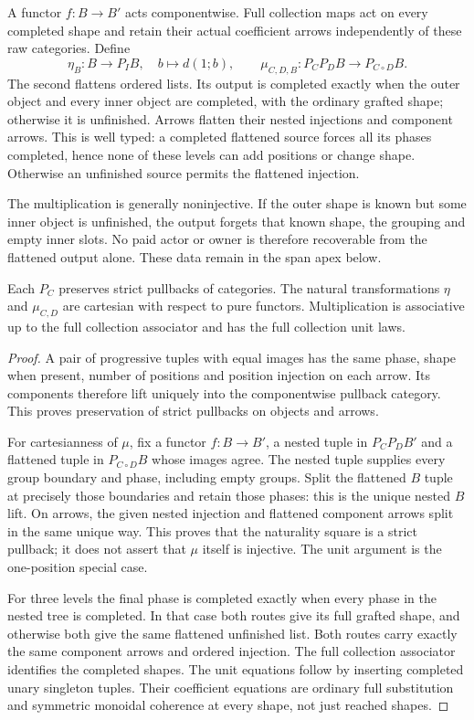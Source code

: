 \documentclass[11pt]{article}
\begin{document}
A functor $f:B\to B'$ acts componentwise. Full collection maps act on every completed shape and retain their actual coefficient arrows independently of these raw categories. Define
\[
 \eta_B:B\to P_I B,\quad b\mapsto d(1;b),\qquad
 \mu_{C,D,B}:P_C P_D B\to P_{C\circ D}B.
\]
The second flattens ordered lists. Its output is completed exactly when the outer object and every inner object are completed, with the ordinary grafted shape; otherwise it is unfinished. Arrows flatten their nested injections and component arrows. This is well typed: a completed flattened source forces all its phases completed, hence none of these levels can add positions or change shape. Otherwise an unfinished source permits the flattened injection.

The multiplication is generally noninjective. If the outer shape is known but some inner object is unfinished, the output forgets that known shape, the grouping and empty inner slots. No paid actor or owner is therefore recoverable from the flattened output alone. These data remain in the span apex below.

\begin{lemma}
Each $P_C$ preserves strict pullbacks of categories. The natural transformations $\eta$ and $\mu_{C,D}$ are cartesian with respect to pure functors. Multiplication is associative up to the full collection associator and has the full collection unit laws.
\end{lemma}
\begin{proof}
A pair of progressive tuples with equal images has the same phase, shape when present, number of positions and position injection on each arrow. Its components therefore lift uniquely into the componentwise pullback category. This proves preservation of strict pullbacks on objects and arrows.

For cartesianness of $\mu$, fix a functor $f:B\to B'$, a nested tuple in $P_C P_D B'$ and a flattened tuple in $P_{C\circ D}B$ whose images agree. The nested tuple supplies every group boundary and phase, including empty groups. Split the flattened $B$ tuple at precisely those boundaries and retain those phases: this is the unique nested $B$ lift. On arrows, the given nested injection and flattened component arrows split in the same unique way. This proves that the naturality square is a strict pullback; it does not assert that $\mu$ itself is injective. The unit argument is the one-position special case.

For three levels the final phase is completed exactly when every phase in the nested tree is completed. In that case both routes give its full grafted shape, and otherwise both give the same flattened unfinished list. Both routes carry exactly the same component arrows and ordered injection. The full collection associator identifies the completed shapes. The unit equations follow by inserting completed unary singleton tuples. Their coefficient equations are ordinary full substitution and symmetric monoidal coherence at every shape, not just reached shapes.\end{proof}
\end{document}
